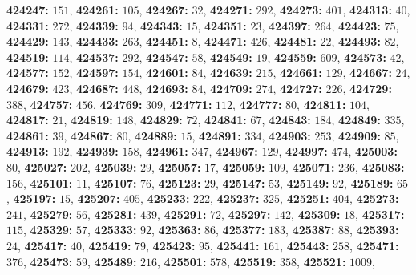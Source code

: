 \textsf{\bfseries 424247:} $151$, \textsf{\bfseries 424261:} $105$, \textsf{\bfseries 424267:} $32$, \textsf{\bfseries 424271:} $292$, \textsf{\bfseries 424273:} $401$, \textsf{\bfseries 424313:} $40$, \textsf{\bfseries 424331:} $272$, \textsf{\bfseries 424339:} $94$, \textsf{\bfseries 424343:} $15$, \textsf{\bfseries 424351:} $23$, \textsf{\bfseries 424397:} $264$, \textsf{\bfseries 424423:} $75$, \textsf{\bfseries 424429:} $143$, \textsf{\bfseries 424433:} $263$, \textsf{\bfseries 424451:} $8$, \textsf{\bfseries 424471:} $426$, \textsf{\bfseries 424481:} $22$, \textsf{\bfseries 424493:} $82$, \textsf{\bfseries 424519:} $114$, \textsf{\bfseries 424537:} $292$, \textsf{\bfseries 424547:} $58$, \textsf{\bfseries 424549:} $19$, \textsf{\bfseries 424559:} $609$, \textsf{\bfseries 424573:} $42$, \textsf{\bfseries 424577:} $152$, \textsf{\bfseries 424597:} $154$, \textsf{\bfseries 424601:} $84$, \textsf{\bfseries 424639:} $215$, \textsf{\bfseries 424661:} $129$, \textsf{\bfseries 424667:} $24$, \textsf{\bfseries 424679:} $423$, \textsf{\bfseries 424687:} $448$, \textsf{\bfseries 424693:} $84$, \textsf{\bfseries 424709:} $274$, \textsf{\bfseries 424727:} $226$, \textsf{\bfseries 424729:} $388$, \textsf{\bfseries 424757:} $456$, \textsf{\bfseries 424769:} $309$, \textsf{\bfseries 424771:} $112$, \textsf{\bfseries 424777:} $80$, \textsf{\bfseries 424811:} $104$, \textsf{\bfseries 424817:} $21$, \textsf{\bfseries 424819:} $148$, \textsf{\bfseries 424829:} $72$, \textsf{\bfseries 424841:} $67$, \textsf{\bfseries 424843:} $184$, \textsf{\bfseries 424849:} $335$, \textsf{\bfseries 424861:} $39$, \textsf{\bfseries 424867:} $80$, \textsf{\bfseries 424889:} $15$, \textsf{\bfseries 424891:} $334$, \textsf{\bfseries 424903:} $253$, \textsf{\bfseries 424909:} $85$, \textsf{\bfseries 424913:} $192$, \textsf{\bfseries 424939:} $158$, \textsf{\bfseries 424961:} $347$, \textsf{\bfseries 424967:} $129$, \textsf{\bfseries 424997:} $474$, \textsf{\bfseries 425003:} $80$, \textsf{\bfseries 425027:} $202$, \textsf{\bfseries 425039:} $29$, \textsf{\bfseries 425057:} $17$, \textsf{\bfseries 425059:} $109$, \textsf{\bfseries 425071:} $236$, \textsf{\bfseries 425083:} $156$, \textsf{\bfseries 425101:} $11$, \textsf{\bfseries 425107:} $76$, \textsf{\bfseries 425123:} $29$, \textsf{\bfseries 425147:} $53$, \textsf{\bfseries 425149:} $92$, \textsf{\bfseries 425189:} $65$, \textsf{\bfseries 425197:} $15$, \textsf{\bfseries 425207:} $405$, \textsf{\bfseries 425233:} $222$, \textsf{\bfseries 425237:} $325$, \textsf{\bfseries 425251:} $404$, \textsf{\bfseries 425273:} $241$, \textsf{\bfseries 425279:} $56$, \textsf{\bfseries 425281:} $439$, \textsf{\bfseries 425291:} $72$, \textsf{\bfseries 425297:} $142$, \textsf{\bfseries 425309:} $18$, \textsf{\bfseries 425317:} $115$, \textsf{\bfseries 425329:} $57$, \textsf{\bfseries 425333:} $92$, \textsf{\bfseries 425363:} $86$, \textsf{\bfseries 425377:} $183$, \textsf{\bfseries 425387:} $88$, \textsf{\bfseries 425393:} $24$, \textsf{\bfseries 425417:} $40$, \textsf{\bfseries 425419:} $79$, \textsf{\bfseries 425423:} $95$, \textsf{\bfseries 425441:} $161$, \textsf{\bfseries 425443:} $258$, \textsf{\bfseries 425471:} $376$, \textsf{\bfseries 425473:} $59$, \textsf{\bfseries 425489:} $216$, \textsf{\bfseries 425501:} $578$, \textsf{\bfseries 425519:} $358$, \textsf{\bfseries 425521:} $1009$, 
